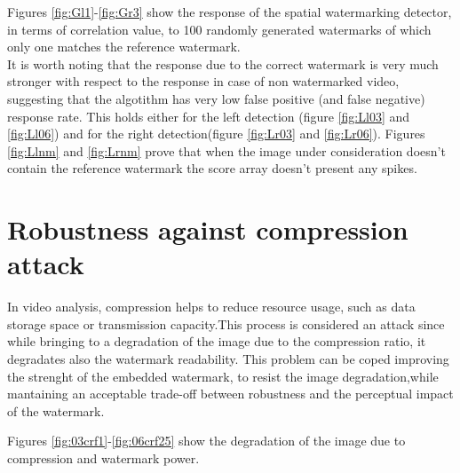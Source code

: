 Figures \ref{fig:Gl1}-\ref{fig:Gr3} show the response of the spatial watermarking detector, in terms of correlation value, to 100 randomly generated watermarks of which only one matches the reference watermark.\\

It is worth noting that the response due to the correct watermark is very much stronger with respect to the response in case of non watermarked video, suggesting that the algotithm has very low false positive (and false negative) response rate. This holds either for the left detection (figure \ref{fig:Ll03} and \ref{fig:Ll06}) and for the right detection(figure \ref{fig:Lr03} and \ref{fig:Lr06}). \newline Figures \ref{fig:Llnm} and  \ref{fig:Lrnm} prove that when the image under consideration doesn't contain the reference watermark the score array doesn't present any spikes.

\section{Robustness against compression attack}

In video analysis, compression helps to reduce resource usage, such as data storage space or transmission capacity.\newline This process is considered an attack since while bringing to a degradation of the image due to the compression ratio, it degradates also the watermark readability.\newline 
This problem can be coped improving the strenght of the embedded watermark, to resist the image degradation,while mantaining an acceptable trade-off between robustness and the perceptual impact of the watermark. \newline

Figures \ref{fig:03crf1}-\ref{fig:06crf25} show the degradation of the image due to compression and watermark power.


